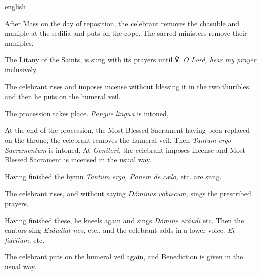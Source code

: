 \documentclass[12pt]{book}
\begin{document}
\myrule


{english}
{After Mass on the day of reposition, the celebrant removes the chasuble and maniple
at the sedilia and puts on the cope. The sacred ministers remove their maniples.

The Litany of the Saints, is sung with its prayers until ℣.
\textit{O Lord, hear my prayer} inclusively, \normaltext{\pageref{litaniae_sanctorum},}

The celebrant rises and imposes incense without blessing it in the two thuribles, and then he puts on the humeral veil.

The procession takes place. \textit{Pangue lingua} is intoned, 

At the end of the procession, the Most Blessed Sacrament having been replaced on the throne, the celebrant removes the humeral veil. Then \textit{Tantum ergo Sacramentum} is intoned. At \textit{Genitori,} the celebrant imposes incense and Most Blessed Sacrament is incensed in the usual way.

Having finished the hymn \textit{Tantum ergo,} \textit{Panem de cælo,} etc. are sung.

The celebrant rises, and without saying \textit{Dóminus vobíscum,} sings the prescribed prayers.

Having finished these, he kneels again and sings \textit{Dómine exáudi} etc. Then the cantors sing
\textit{Exáudiat nos,} etc., and the celebrant adds in a lower voice. \textit{Et fidélium,} etc.

The celebrant puts on the humeral veil again, and Benediction is given in the usual way.}
\end{document}
